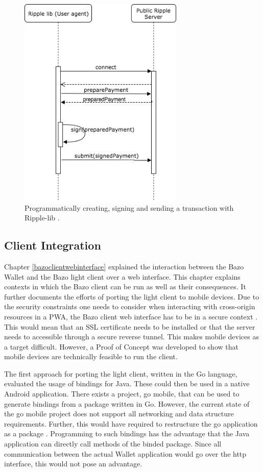 \begin{figure}
\centering
\includegraphics[width=0.7\textwidth]{diagrams/ripplelibSendTX.png}
\caption{\label{fig:ripplesendTx}Programmatically creating, signing and sending a transaction with Ripple-lib \cite{ripplelib}.}
\end{figure}


\subsection{Client Integration}\label{bazomobile}

Chapter \ref{bazoclientwebinterface} explained the interaction between the Bazo Wallet and the Bazo light client over a web interface.
This chapter explains contexts in which the Bazo client can be run as well as their consequences. It further documents the efforts of porting the light client to mobile devices.
Due to the security constraints one needs to consider when interacting with cross-origin resources in a PWA, the Bazo client web interface has to be in a secure context \cite{securitychrome}. This would mean that an SSL certificate needs to be installed or that the server needs to accessible through a secure reverse tunnel.
This makes mobile devices as a target difficult. However, a Proof of Concept was developed to show that mobile devices are technically feasible to run the client.

The first approach for porting the light client, written in the Go language, evaluated the usage of bindings for Java. These could then be used in a native Android application. There exists a project, go mobile, that can be used to generate bindings from a package written in Go. However, the current state of the go mobile project does not support all networking and data structure requirements. Further, this would have required to restructure the go application as a package \cite{gobind}. Programming to such bindings has the advantage that the Java application can directly call methods of the binded package. Since all communication between the actual Wallet application would go over the http interface, this would not pose an advantage.

